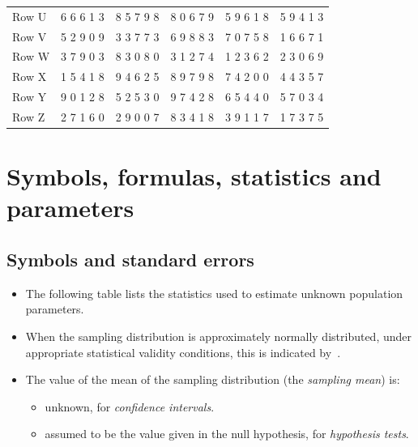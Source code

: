 \documentclass[
  11pt,
  a4paper,
  krantz2]{krantz}
\providecommand{\tightlist}{%
  \setlength{\itemsep}{0pt}\setlength{\parskip}{0pt}}
\begin{document}
\begin{table}
\begin{tabular}[t]{llllll}
\addlinespace
Row U & 6 6 6 1 3 & 8 5 7 9 8 & 8 0 6 7 9 & 5 9 6 1 8 & 5 9 4 1 3\\
Row V & 5 2 9 0 9 & 3 3 7 7 3 & 6 9 8 8 3 & 7 0 7 5 8 & 1 6 6 7 1\\
Row W & 3 7 9 0 3 & 8 3 0 8 0 & 3 1 2 7 4 & 1 2 3 6 2 & 2 3 0 6 9\\
Row X & 1 5 4 1 8 & 9 4 6 2 5 & 8 9 7 9 8 & 7 4 2 0 0 & 4 4 3 5 7\\
Row Y & 9 0 1 2 8 & 5 2 5 3 0 & 9 7 4 2 8 & 6 5 4 4 0 & 5 7 0 3 4\\
\addlinespace
Row Z & 2 7 1 6 0 & 2 9 0 0 7 & 8 3 4 1 8 & 3 9 1 1 7 & 1 7 3 7 5\\
\bottomrule
\end{tabular}
\end{table}

\chapter{Symbols, formulas, statistics and parameters}\label{StatisticsAndParameters}

\section{Symbols and standard errors}\label{Symbols}

\begin{itemize}
\item
  The following table lists the statistics used to estimate unknown population parameters. \tightlist
\item
  When the sampling distribution is approximately normally distributed, under appropriate statistical validity conditions, this is indicated by~.
\item
  The value of the mean of the sampling distribution (the \emph{sampling mean}) is:

  \begin{itemize}
  \tightlist
  \item
    unknown, for \emph{confidence intervals}.
  \item
    assumed to be the value given in the null hypothesis, for \emph{hypothesis tests}.
  \end{itemize}
\end{itemize}
\end{document}
